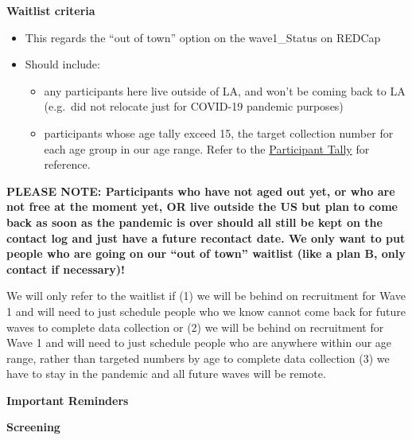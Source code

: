 \documentclass[]{book}
\providecommand{\tightlist}{%
  \setlength{\itemsep}{0pt}\setlength{\parskip}{0pt}}
\begin{document}
\textbf{Waitlist criteria}

\begin{itemize}
\tightlist
\item
  This regards the ``out of town'' option on the wave1\_Status on REDCap
\item
  Should include:

  \begin{itemize}
  \tightlist
  \item
    any participants here live outside of LA, and won't be coming back to LA (e.g.~did not relocate just for COVID-19 pandemic purposes)
  \item
    participants whose age tally exceed 15, the target collection number for each age group in our age range. Refer to the \href{https://ucla.app.box.com/file/724688028024}{Participant Tally} for reference.
  \end{itemize}
\end{itemize}

\textbf{PLEASE NOTE: Participants who have not aged out yet, or who are not free at the moment yet, OR live outside the US but plan to come back as soon as the pandemic is over should all still be kept on the contact log and just have a future recontact date. We only want to put people who are going on our ``out of town'' waitlist (like a plan B, only contact if necessary)!}

We will only refer to the waitlist if (1) we will be behind on recruitment for Wave 1 and will need to just schedule people who we know cannot come back for future waves to complete data collection or (2) we will be behind on recruitment for Wave 1 and will need to just schedule people who are anywhere within our age range, rather than targeted numbers by age to complete data collection (3) we have to stay in the pandemic and all future waves will be remote.

\textbf{Important Reminders}

\textbf{Screening}
\end{document}

